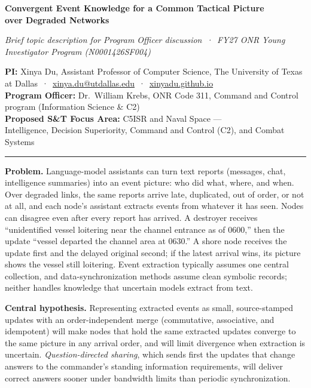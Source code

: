 \documentclass[11pt]{article}
\newcommand{\head}[1]{{\color{navy}\textbf{#1}}\enspace}
\newcommand{\POline}{Dr.\ William Krebs, ONR Code 311, Command and Control program (Information Science \& C2)}
\newcommand{\FocusArea}{C5ISR and Naval Space ---\\\hspace*{1.2em}Intelligence, Decision Superiority, Command and Control (C2), and Combat Systems}
\begin{document}
\begin{center}
{\fontsize{15.5}{18.5}\selectfont\bfseries\color{navy} Convergent Event Knowledge for a Common Tactical Picture\\[1pt] over Degraded Networks\par}
\vspace{3pt}
{\small\itshape Brief topic description for Program Officer discussion \,·\, FY27 ONR Young Investigator Program (N0001426SF004)\par}
\end{center}
\vspace{-2pt}
{\small
\textbf{PI:} Xinya Du, Assistant Professor of Computer Science, The University of Texas at Dallas \,·\, \href{mailto:xinya.du@utdallas.edu}{xinya.du@utdallas.edu} \,·\, \href{https://xinyadu.github.io}{xinyadu.github.io}\\
\textbf{Program Officer:} \POline\\
\textbf{Proposed S\&T Focus Area:} \FocusArea\par}
\vspace{-3pt}
{\color{navy}\rule{\linewidth}{0.6pt}}

\head{Problem.} Language-model assistants can turn text reports (messages, chat, intelligence summaries) into an event picture: who did what, where, and when. Over degraded links, the same reports arrive late, duplicated, out of order, or not at all, and each node's assistant extracts events from whatever it has seen. Nodes can disagree even after every report has arrived. A destroyer receives ``unidentified vessel loitering near the channel entrance as of 0600,'' then the update ``vessel departed the channel area at 0630.'' A shore node receives the update first and the delayed original second; if the latest arrival wins, its picture shows the vessel still loitering. Event extraction typically assumes one central collection, and data-synchronization methods assume clean symbolic records; neither handles knowledge that uncertain models extract from text.

\head{Central hypothesis.} Representing extracted events as small, source-stamped updates with an order-independent merge (commutative, associative, and idempotent) will make nodes that hold the same extracted updates converge to the same picture in any arrival order, and will limit divergence when extraction is uncertain. \emph{Question-directed sharing}, which sends first the updates that change answers to the commander's standing information requirements, will deliver correct answers sooner under bandwidth limits than periodic synchronization.
\end{document}
